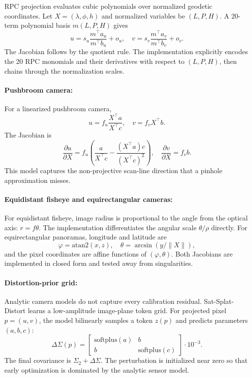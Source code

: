 \documentclass{article}
\begin{document}
RPC projection evaluates cubic polynomials over normalized geodetic coordinates. Let $X=(\lambda,\phi,h)$ and normalized variables be $(L,P,H)$. A 20-term polynomial basis $m(L,P,H)$ gives
\begin{equation}
  u = s_u\frac{m^\top a_u}{m^\top b_u}+o_u,\quad
  v = s_v\frac{m^\top a_v}{m^\top b_v}+o_v.
\end{equation}
The Jacobian follows by the quotient rule. The implementation explicitly encodes the 20 RPC monomials and their derivatives with respect to $(L,P,H)$, then chains through the normalization scales.

\paragraph{Pushbroom camera:}

For a linearized pushbroom camera,
\begin{equation}
  u = f_u \frac{X^\top a}{X^\top c},\quad v = f_v X^\top b.
\end{equation}
The Jacobian is
\begin{equation}
  \frac{\partial u}{\partial X} =
  f_u\left(\frac{a}{X^\top c} - \frac{(X^\top a)c}{(X^\top c)^2}\right),
  \quad
  \frac{\partial v}{\partial X}=f_v b.
\end{equation}
This model captures the non-projective scan-line direction that a pinhole approximation misses.

\paragraph{Equidistant fisheye and equirectangular cameras:}

For equidistant fisheye, image radius is proportional to the angle from the optical axis: $r=f\theta$. The implementation differentiates the angular scale $\theta/\rho$ directly. For equirectangular panoramas, longitude and latitude are
\begin{equation}
  \varphi = \text{atan2}(x,z),\quad \theta=\arcsin(y/\|X\|),
\end{equation}
and the pixel coordinates are affine functions of $(\varphi,\theta)$. Both Jacobians are implemented in closed form and tested away from singularities.

\paragraph{Distortion-prior grid:}

Analytic camera models do not capture every calibration residual. Sat-Splat-Distort learns a low-amplitude image-plane token grid. For projected pixel $p=(u,v)$, the model bilinearly samples a token $z(p)$ and predicts parameters $(a,b,c)$:
\begin{equation}
  \Delta\Sigma(p)=
  \begin{bmatrix}
  \text{softplus}(a) & b\\
  b & \text{softplus}(c)
  \end{bmatrix}\cdot 10^{-3}.
\end{equation}
The final covariance is $\Sigma_2+\Delta\Sigma$. The perturbation is initialized near zero so that early optimization is dominated by the analytic sensor model.
\end{document}
